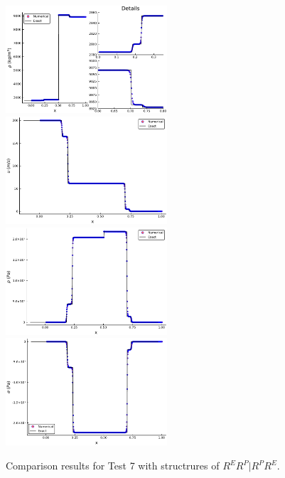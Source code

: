 \documentclass[review]{elsarticle}
\begin{document}
\begin{figure}
  \centering
  \includegraphics[width= 6cm] {case6rho.pdf}
  \includegraphics[width= 6cm] {case6u.pdf}
  \includegraphics[width= 6cm] {case6p.pdf}
  \includegraphics[width= 6cm] {case6sigma.pdf}

    \caption{Comparison results for Test 7 with structrures of $R^ER^P|R^PR^E$.  }
  \label{fig:case7}
\end{figure}

%
%
\end{document}
